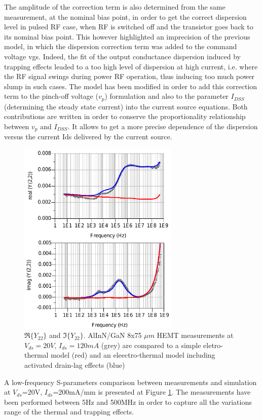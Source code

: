 \documentclass[conference]{IEEEtran}
\begin{document}
The amplitude of the correction term is also determined from the same measurement, at the nominal bias point, in order to get the correct dispersion level in pulsed RF case, when RF is switched off and the transistor goes back to its nominal bias point. This however highlighted an imprecision of the previous model, in which the dispersion correction term was added to the command voltage vgs. Indeed, the fit of the output conductance dispersion induced by trapping effects leaded to a too high level of dispersion at high current, i.e. where the RF signal swings during power RF operation, thus inducing too much power slump in such cases. The model has been modified in order to add this correction term to the pinch-off voltage ($v_p$) formulation and also to the parameter $I_{DSS}$ (determining the steady state current) into the current source equations. Both contributions are written in order to conserve the proportionality relationship between $v_p$ and $I_{DSS}$. It allows to get a more precise dependence of the dispersion versus the current Ids delivered by the current source.

\begin{figure}[ht!] %
    \centering
    \includegraphics[width=3.0in]{Compare_S.pdf}
    \caption{$\Re\{Y_{22}\}$ and $\Im\{Y_{22}\}$. AlInN/GaN 8x75 $\mu m$ HEMT measurements at $V_{ds}=20V$, $I_{ds}=120mA$ (grey) are compared to a simple eletro-thermal model (red) and an eleectro-thermal model including activated drain-lag effects (blue)}
    \label{Compare_S}
\end{figure}

A low-frequency S-parameters comparison between measurements and simulation at $V_{ds}$=20V, $I_{ds}$=200mA/mm is presented at Figure \ref{Compare_S}. The measurements have been performed between 5Hz and 500MHz in order to capture all the variations range of the thermal and trapping effects.
\end{document}
